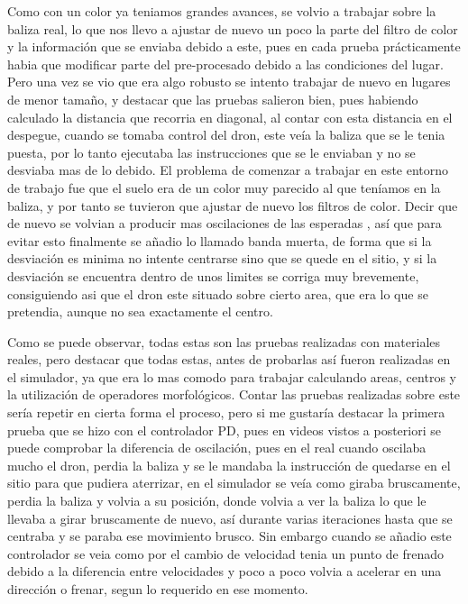 \hspace{1 cm} Como con un color ya teniamos grandes avances, se volvio a trabajar sobre la baliza real, lo que nos llevo a ajustar de nuevo un poco la parte del filtro de color y la informaci\'on que se enviaba debido a este, pues en cada prueba pr\'acticamente habia que modificar parte del pre-procesado debido a las condiciones del lugar. Pero una vez se vio que era algo robusto se intento trabajar de nuevo en lugares de menor tamaño, y destacar que las pruebas salieron bien, pues habiendo calculado la distancia que recorria en diagonal, al contar con esta distancia en el despegue, cuando se tomaba control del dron, este ve\'ia la baliza que se le tenia puesta, por lo tanto ejecutaba las instrucciones que se le enviaban y no se desviaba mas de lo debido. 
\hspace{1 cm} El problema de comenzar a trabajar en este entorno de trabajo fue que el suelo era de un color muy parecido al que ten\'iamos en la baliza, y por tanto se tuvieron que ajustar de nuevo los filtros de color. Decir que de nuevo se volvian a producir mas oscilaciones de las esperadas , as\'i que para evitar esto finalmente se añadio lo llamado banda muerta, de forma que si la desviaci\'on es minima no intente centrarse sino que se quede en el sitio, y si la desviaci\'on se encuentra dentro de unos limites se corriga muy brevemente, consiguiendo asi que el dron este situado sobre cierto area, que era lo que se pretendia, aunque no sea exactamente el centro.
 

\hspace{1 cm} Como se puede observar, todas estas son las pruebas realizadas con materiales reales, pero destacar que todas estas, antes de probarlas as\'i fueron realizadas en el simulador, ya que era lo mas comodo para trabajar calculando areas, centros y la utilizaci\'on de operadores morfol\'ogicos. Contar las pruebas realizadas sobre este ser\'ia repetir en cierta forma el proceso, pero si me gustar\'ia destacar la primera prueba que se hizo con el controlador PD, pues en videos vistos a posteriori se puede comprobar la diferencia de oscilaci\'on, pues en el real cuando oscilaba mucho el dron, perdia la baliza y se le mandaba la instrucci\'on de quedarse en el sitio para que pudiera aterrizar, en el simulador se ve\'ia como giraba bruscamente, perdia la baliza y volvia a su posici\'on, donde volvia a ver la baliza lo que le llevaba a girar bruscamente de nuevo, as\'i durante varias iteraciones hasta que se centraba y se paraba ese movimiento brusco. Sin embargo cuando se añadio este controlador se veia como por el cambio de velocidad tenia un punto de frenado debido a la diferencia entre velocidades y poco a poco volvia a acelerar en una direcci\'on o frenar, segun lo requerido en ese momento. 



